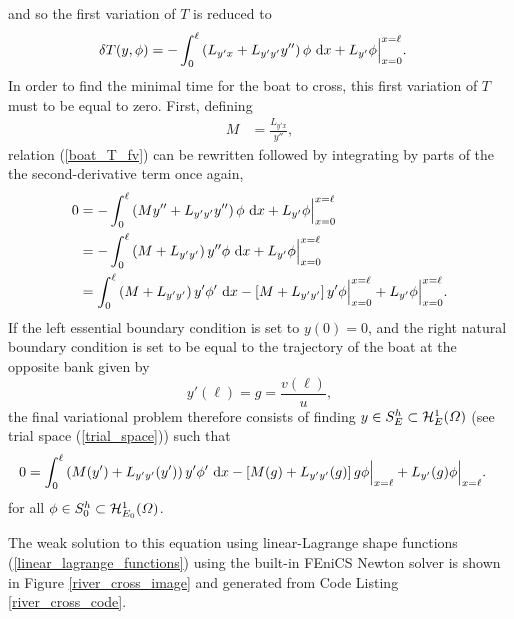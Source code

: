 and so the first variation of $T$ is reduced to
\begin{align}
  \label{boat_T_fv}
  \delta T(y,\phi) &= - \int_0^{\ell} \left( L_{y'x} + L_{y'y'} y'' \right) \phi \ \mathrm{d}x + L_{y'} \phi \Big|_{x=0}^{x=\ell}.
\end{align}
In order to find the minimal time for the boat to cross, this first variation of $T$ must to be equal to zero.  First, defining
\begin{align*}
  M &= \frac{L_{y'x}}{y''},
\end{align*}
relation (\ref{boat_T_fv}) can be rewritten followed by integrating by parts of the the second-derivative term once again,
{\footnotesize
\begin{align*}
  0 &= - \int_0^{\ell} \left( M y'' + L_{y'y'} y'' \right) \phi \ \mathrm{d}x + L_{y'} \phi \Big|_{x=0}^{x=\ell} \\
    &= - \int_0^{\ell} \left( M + L_{y'y'} \right) y'' \phi \ \mathrm{d}x + L_{y'} \phi \Big|_{x=0}^{x=\ell} \\
    &= \int_0^{\ell} \left( M + L_{y'y'} \right) y' \phi' \ \mathrm{d}x - \left[ M + L_{y'y'} \right] y' \phi \Big|_{x=0}^{x=\ell} + L_{y'} \phi \Big|_{x=0}^{x=\ell}.
\end{align*}}
If the left essential boundary condition is set to $y(0) = 0$, and the right natural boundary condition is set to be equal to the trajectory of the boat at the opposite bank given by
$$y'(\ell) = g = \frac{v(\ell)}{u},$$
the final variational problem therefore consists of finding $y \in S_E^h \subset \mathcal{H}_E^1(\varOmega)$ (see trial space (\ref{trial_space})) such that
{\tiny
\begin{align*}
  0 &= \int_0^{\ell} \left( M(y') + L_{y'y'}(y') \right) y' \phi' \ \mathrm{d}x - \left[ M(g) + L_{y'y'}(g) \right] g \phi \Big|_{x=\ell} + L_{y'}(g) \phi \Big|_{x=\ell}.
\end{align*}}
for all $\phi \in S_0^h \subset \mathcal{H}_{E_0}^1(\varOmega)$.

The weak solution to this equation using linear-Lagrange shape functions (\ref{linear_lagrange_functions}) using the built-in FEniCS Newton solver is shown in Figure \ref{river_cross_image} and generated from Code Listing \ref{river_cross_code}.


